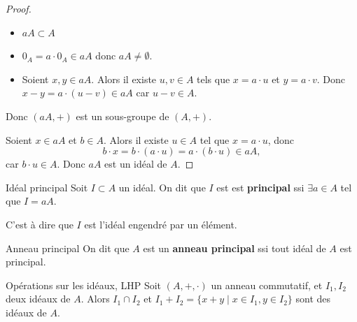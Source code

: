 \begin{proof}
    \begin{itemize}
        \item $aA \subset A$ 
        \item $0_A = a \cdot 0_A \in aA$ donc $aA \neq \emptyset$.
        \item Soient $x, y \in aA$. Alors il existe $u, v \in A$ tels que $x = a \cdot u$ et $y = a \cdot v$.
        Donc $x - y = a \cdot (u - v) \in aA$ car $u - v \in A$.

    \end{itemize}

    Donc $(aA, +)$ est un sous-groupe de $(A, +)$.

    Soient $x \in aA$ et $b \in A$. Alors il existe $u \in A$ tel que $x = a \cdot u$, donc 
    \[
        b \cdot x = b \cdot (a \cdot u) = a \cdot (b \cdot u) \in aA,   
    \]
    car $b \cdot u \in A$.
    Donc $aA$ est un idéal de $A$.
\end{proof}

\begin{definition}{Idéal principal}{}
    Soit $I \subset A$ un idéal. On dit que $I$ est 
    est \textbf{principal} ssi $\exists a \in A$ tel que $I = aA$.

    C'est à dire que $I$ est l'idéal engendré par un élément.
\end{definition}

\begin{definition}{Anneau principal}{}
    On dit que $A$ est un \textbf{anneau principal} ssi tout
    idéal de $A$ est principal.
\end{definition}

\begin{proposition}{Opérations sur les idéaux, LHP}{}
    Soit $(A, +, \cdot)$ un anneau commutatif, et $I_1, I_2$ deux idéaux de $A$. Alors 
    $I_1 \cap I_2$ et $I_1 + I_2 = \{x + y \mid x \in I_1, y \in I_2\}$ sont des idéaux de $A$.
\end{proposition}

